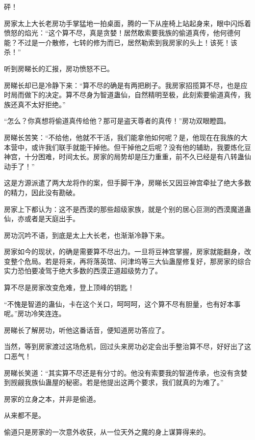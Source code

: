 
\begin{this_body}

砰！

房家太上大长老房功手掌猛地一拍桌面，腾的一下从座椅上站起身来，眼中闪烁着愤怒的焰光：“这个算不尽，真是贪婪！居然敢索要我族的偷道真传，他何德何能？不过是一介散修，七转的修为而已，居然勒索到我房家的头上！该死！该杀！”

听到房睇长的汇报，房功愤怒不已。

房睇长却已是冷静下来：“算不尽的确是有两把刷子。我房家招揽算不尽，也是应时局而做下的决定。算不尽身为智道蛊仙，自然精明至极，此刻索要偷道真传，我族还真不太好拒绝。”

“怎么？你真想将偷道真传给他？那可是盗天尊者的真传！”房功双眼瞪圆。

房睇长苦笑：“不给他，他就不干活，我们能拿他如何呢？是，他现在在我族的大本营中，或许我们联手就能干掉他。但干掉他之后呢？没有他的辅助，我要炼化豆神宫，十分困难，时间太长。房家的局势却是压力重重，前不久已经是有八转蛊仙动手了！”

这是方源派遣了两大龙将作的案，但手脚干净，房睇长又因豆神宫牵扯了绝大多数的精力，因此没有勘破。

房家上下都认为：这不是西漠的那些超级家族，就是个别的居心叵测的西漠魔道蛊仙，亦或者是天庭出手。

房功沉吟不语，到底是太上大长老，也渐渐冷静下来。

房家如今的现状，的确是需要算不尽出力。一旦将豆神宫掌握，房家就能翻身，改变整个危局。若是将来，再将落英馆、问津坞等三大仙蛊屋修复好，那房家的综合实力恐怕要凌驾于绝大多数的西漠正道超级势力了。

算不尽是房家改变危难，登上顶峰的钥匙！

“不愧是智道的蛊仙，卡在这个关口，呵呵呵，这个算不尽有胆量，也有好本事呢。”房功冷笑连连。

房睇长了解房功，听他这番话音，便知道房功答应了。

当然，等到房家渡过这场危机，回过头来房功必定会出手整治算不尽，好好出了这口恶气！

房睇长笑道：“其实算不尽还是有分寸的。他没有索要我的智道传承，也没有贪婪到觊觎我族仙蛊屋的秘密。若是他提出这两个要求，我们就真的为难了。”

房家的立身之本，并非是偷道。

从来都不是。

偷道只是房家的一次意外收获，从一位天外之魔的身上谋算得来的。


\end{this_body}
